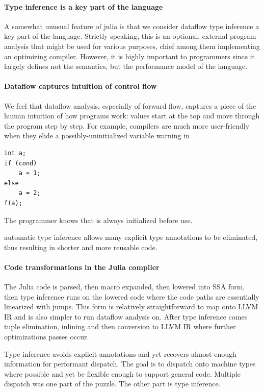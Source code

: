 \documentclass[pldi]{sigplanconf-pldi15}
\begin{document}
\paragraph{Type inference is a key part of the language}
A somewhat unusual feature of julia is that we consider dataflow type inference a
key part of the language. Strictly speaking, this is an optional, external program
analysis that might be used for various purposes, chief among them implementing
an optimizing compiler. However, it is highly important to programmers since it
largely defines not the semantics, but the performance model of the language.

\paragraph{Dataflow captures intuition of control flow}
We feel that dataflow analysis, especially of forward flow, captures a piece of
the human intuition of how programs work: values start at the top and move through
the program step by step. For example, compilers are much more user-friendly
when they elide a possibly-uninitialized variable warning in

\begin{verbatim}
int a;
if (cond)
    a = 1;
else
    a = 2;
f(a);
\end{verbatim}

The programmer knows that  is always initialized before use.

automatic type inference allows many
explicit type annotations to be eliminated, thus resulting in shorter and more
reusable code.

\paragraph{Code transformations in the Julia compiler}
The Julia code is parsed, then macro expanded, then lowered into SSA form, then
type inference runs on the lowered code where the code paths are essentially
linearized with jumps. This form is relatively straightforward to map onto LLVM
IR and is also simpler to run dataflow analysis on. After type inference comes
tuple elimination, inlining and then conversion to LLVM IR where further
optimizations passes occur.

Type inference avoids explicit annotations and yet recovers almost enough information for performant dispatch. The goal is to dispatch onto machine types where possible and yet be flexible enough to support general code. Multiple dispatch was one part of the puzzle. The other part is type inference.
\end{document}
